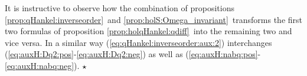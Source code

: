 \begin{remark} \rm
It is instructive to observe how the combination of
propositions \ref{prop:qHankel:inverseorder}\ and \ref{prop:holS:Omega_invariant}\
transforms the first two formulas of proposition \ref{prop:holqHankel:qdiff}\ into the
remaining two and vice versa. In a similar way
(\ref{eq:qHankel:inverseorder:aux:2}) interchanges
(\ref{eq:auxH:Dq2:pos}-\ref{eq:auxH:Dq2:neg}) as well as
(\ref{eq:auxH:nabq:pos}-\ref{eq:auxH:nabq:neg}).
$\hfill \star$
\end{remark}
